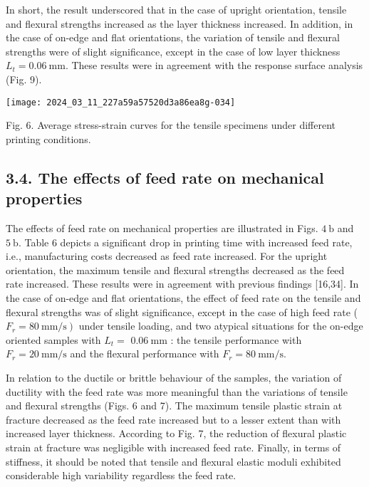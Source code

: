 \documentclass[10pt]{article}
\begin{document}
In short, the result underscored that in the case of upright orientation, tensile and flexural strengths increased as the layer thickness increased. In addition, in the case of on-edge and flat orientations, the variation of tensile and flexural strengths were of slight significance, except in the case of low layer thickness $L_{t}=0.06 \mathrm{~mm}$. These results were in agreement with the response surface analysis (Fig. 9).

\begin{center}
\texttt{[image: 2024\_03\_11\_227a59a57520d3a86ea8g-034]}
\end{center}

Fig. 6. Average stress-strain curves for the tensile specimens under different printing conditions.

\subsection*{3.4. The effects of feed rate on mechanical properties}
The effects of feed rate on mechanical properties are illustrated in Figs. $4 \mathrm{~b}$ and $5 \mathrm{~b}$. Table 6 depicts a significant drop in printing time with increased feed rate, i.e., manufacturing costs decreased as feed rate increased. For the upright orientation, the maximum tensile and flexural strengths decreased as the feed rate increased. These results were in agreement with previous findings [16,34]. In the case of on-edge and flat orientations, the effect of feed rate on the tensile and flexural strengths was of slight significance, except in the case of high feed rate ( $\left.F_{r}=80 \mathrm{~mm} / \mathrm{s}\right)$ under tensile loading, and two atypical situations for the on-edge oriented samples with $L_{t}=$ $0.06 \mathrm{~mm}$ : the tensile performance with $F_{r}=20 \mathrm{~mm} / \mathrm{s}$ and the flexural performance with $F_{r}=80 \mathrm{~mm} / \mathrm{s}$.

In relation to the ductile or brittle behaviour of the samples, the variation of ductility with the feed rate was more meaningful than the variations of tensile and flexural strengths (Figs. 6 and 7). The maximum tensile plastic strain at fracture decreased as the feed rate increased but to a lesser extent than with increased layer thickness. According to Fig. 7, the reduction of flexural plastic strain at fracture was negligible with increased feed rate. Finally, in terms of stiffness, it should be noted that tensile and flexural elastic moduli exhibited considerable high variability regardless the feed rate.
\end{document}
